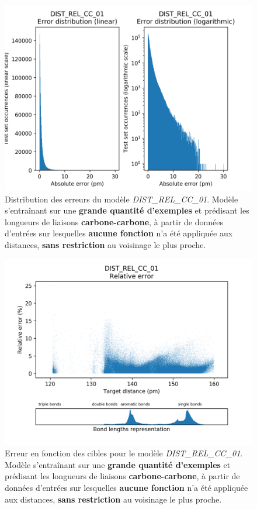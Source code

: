 \begin{figure}[!h]
	\centering
	
	\includegraphics[scale=0.75]{../figures/DIST_REL_CC_01/DIST_REL_CC_01_distrib_rmse_val.png}	
	
	\caption{Distribution des erreurs du modèle \emph{DIST\_REL\_CC\_01}. Modèle s'entraînant sur une \textbf{grande quantité d'exemples} et prédisant les longueurs de liaisons \textbf{carbone-carbone}, à partir de données d'entrées sur lesquelles \textbf{aucune fonction} n'a été appliquée aux distances, \textbf{sans restriction} au voisinage le plus proche.}
\end{figure}
\begin{figure}[!h]
	\centering
	
	\includegraphics[scale=0.75]{../figures/DIST_REL_CC_01/DIST_REL_CC_01_distrib_rmse_dist.png}	
	
	\caption{Erreur en fonction des cibles pour le modèle \emph{DIST\_REL\_CC\_01}. Modèle s'entraînant sur une \textbf{grande quantité d'exemples} et prédisant les longueurs de liaisons \textbf{carbone-carbone}, à partir de données d'entrées sur lesquelles \textbf{aucune fonction} n'a été appliquée aux distances, \textbf{sans restriction} au voisinage le plus proche.}
	\end{figure}

